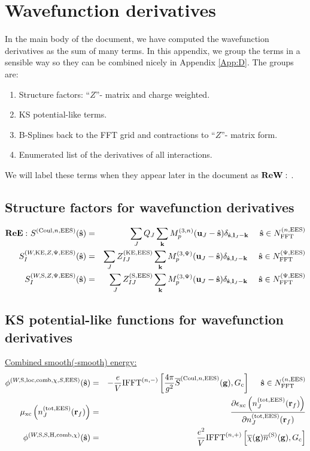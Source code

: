 \documentclass[paper=a4, fontsize=11pt]{article} %
\numberwithin{equation}{section} %
\numberwithin{figure}{section} %
\numberwithin{table}{section} %
\newcommand{\p}{\partial}
\newcommand{\ol}{\overline}
\newcommand{\bu}{{\bf{u}}}
\newcommand{\bl}{{\bf{l}}}
\newcommand{\bk}{{\bf{k}}}
\newcommand{\bs}{{\bf{s}}}
\newcommand{\bg}{{\bf{g}}}
\newcommand{\br}{{\bf{r}}}
\newcommand{\hs}{{\hat{\bf{s}}}}
\newcommand{\rS}{{\mathrm{S}}}
\newcommand{\rKE}{{\mathrm{KE}}}
\newcommand{\rEES}{{\mathrm{EES}}}
\newcommand{\rxc}{{\mathrm{xc}}}
\newcommand{\rCo}{{\mathrm{Coul}}}
\newcommand{\rH}{{\mathrm{H}}}
\newcommand{\rcomb}{{\mathrm{comb}}}
\newcommand{\rlo}{{\mathrm{loc}}}
\newcommand{\rtot}{{\mathrm{tot}}}
\newcommand{\NFFTnEES}{{N^{(n,\rEES)}_{\mathrm{FFT}}}}
\newcommand{\NFFTpEES}{{N^{\mathrm{(\Psi,\rEES})}_{\mathrm{FFT}}}}
\newcommand{\Gc}{{G_{\mathrm{c}}}}
\newcommand{\Mn}{{M_p^{(3,n)}}}
\newcommand{\Mp}{{M_p^{(3,\Psi)}}}
\newcommand{\IFFTn}{{\mathrm{IFFT}^{(n,+)}}}
\newcommand{\IFFTni}{{\mathrm{IFFT}^{(n,-)}}}
\newcommand{\hsinpEES}{{\ \ \ \ \hs \in \NFFTpEES}}
\newcommand{\hsinnEES}{{\ \ \ \ \hs \in \NFFTnEES}}
\newcommand{\ReE}{{{\bf ReE:\ }}}
\newcommand{\ReW}{{{\bf ReW:\ }}}
\begin{document}
\newpage
\section{Wavefunction derivatives}\label{App:dEdphi}

In the main body of the document, we have computed the wavefunction derivatives as the sum of many terms. In this appendix, we group the terms in a sensible way so they can be combined nicely in Appendix \ref{App:D}. The groups are:
\begin{enumerate}
\item Structure factors: ``$Z$''- matrix and charge weighted.
\item KS potential-like terms.
\item B-Splines back to the FFT grid and contractions to ``$Z$''- matrix form.
\item Enumerated list of the derivatives of all interactions.
\end{enumerate}

We will label these terms when they appear later in the document as $\ReW$.

\subsection{Structure factors for wavefunction derivatives}
\begin{eqnarray}
\label{eq:termsdpS}
\ReE S^{(\rCo,n,\rEES)}(\hat \bs)
&=&\sum_J Q_J \sum_{\bk} \Mn(\bu_{J}-\hat \bs)\delta_{\hat \bs,\bl_J-\bk} \hsinnEES\\
S_I^{(W,\rKE,Z,\Psi,\rEES)}(\hs) &=& \sum_J Z_{IJ} ^{(\rKE,\rEES)} \sum_{\bk} \Mp(\bu_{J}-\hat \bs) \delta_{\hat \bs,\bl_J-\bk} \hsinpEES \\
S_I^{(W,\rS,Z,\Psi,\rEES)}(\hs) &=& \sum_J Z_{IJ} ^{(\rS,\rEES)} \sum_{\bk} \Mp(\bu_{J}-\hat \bs) \delta_{\hat \bs,\bl_J-\bk} \hsinpEES \\
\end{eqnarray}

\subsection{KS potential-like functions for wavefunction derivatives}
\underline{Combined smooth(-smooth) energy:}
\begin{eqnarray}
\phi^{(W,\rS,\rlo,\rcomb,\chi,S,\rEES)}(\hs) 
&=& -\frac{e}{V} \IFFTni \left[\frac{4\pi }{g^2} \ol S^{(\rCo,n,\rEES)}(\bg), \Gc \right] \hsinnEES\\
\label{phi:fmuxc}
\mu_{\rxc}\left(n_J^{(\rtot,\rEES)}(\br_f)\right)
&=& \frac{\p \epsilon_{\rxc}\left(n_J^{(\rtot,\rEES)}(\br_f)\right)}{\p n_J^{(\rtot,\rEES)}(\br_f)}\\
\label{phi:phichiS}
\phi^{(W,\rS,\rS,\rH,\rcomb,\chi)}(\hs) &=& \frac{e^2}{V} \IFFTn \left[\ol \chi(\bg) \ol{n}^{(\rS)}(\bg),\Gc \right]
\end{eqnarray}
\end{document}
